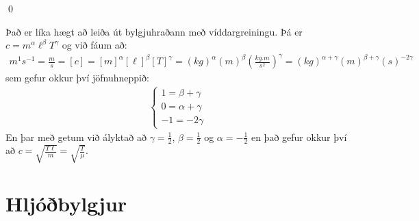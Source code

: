 \ifdefined \wholebook \else\documentclass[oneside]{book}\usepackage{EdlBook}\graphicspath{{figures/}}
\begin{document}
\qed

Það er líka hægt að leiða út bylgjuhraðann með víddargreiningu. Þá er $c = m^\alpha \ell^\beta T^\gamma$ og við fáum að:
\begin{align*}
  \si{m^1}\si{s^{-1}} = \frac{\si{m}}{\si{s}} = [c] = [m]^\alpha [\ell]^\beta [T]^\gamma = \left( \si{kg} \right)^\alpha \left( \si{m} \right)^\beta \left( \frac{\si{kg.m}}{\si{s^2}} \right)^\gamma = (\si{kg})^{\alpha + \gamma} (\si{m})^{\beta + \gamma} (s)^{-2\gamma}
\end{align*}
sem gefur okkur því jöfnuhneppið:
\begin{align*}
    \begin{cases}
    1 = \beta + \gamma \\
    0 = \alpha + \gamma \\
    -1 = -2\gamma
    \end{cases}
\end{align*}
En þar með getum við ályktað að $\gamma = \frac{1}{2}$, $\beta = \frac{1}{2}$ og $\alpha = -\frac{1}{2}$ en það gefur okkur því að $c = \sqrt{\frac{T\ell}{m}} = \sqrt{\frac{T}{\mu}}$.

\section{Hljóðbylgjur}
\end{document}
